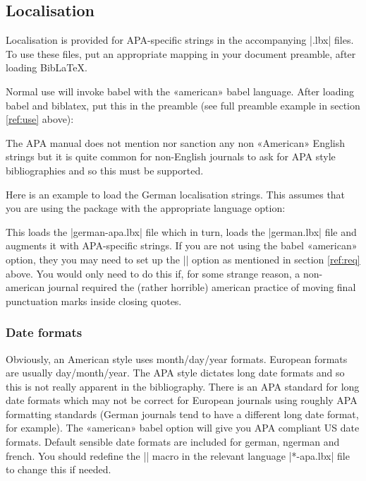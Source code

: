 \documentclass{ltxdockit}
\begin{document}
\subsection{Localisation}

Localisation is provided for APA-specific strings in the accompanying
|.lbx| files. To use these files, put an appropriate mapping in your
document preamble, after loading Bib\LaTeX.

Normal use will invoke babel with the «american» babel language. After
loading babel and biblatex, put this in the preamble (see full preamble
example in section \ref{ref:use} above):

\begin{ltxcode}
\end{ltxcode}

The APA manual does not mention nor sanction any non «American» English
strings but it is quite common for non-English journals to ask for APA style
bibliographies and so this must be supported.

Here is an example to load the German localisation strings. This assumes
that you are using the  package with the appropriate language
option:

\begin{ltxcode}
\end{ltxcode}

This loads the |german-apa.lbx| file which in turn, loads the |german.lbx|
file and augments it with APA-specific strings. If you are not using the
babel «american» option, they you may need to set up the
|\DeclareQuotePunctuation| option as mentioned in section \ref{ref:req} above.
You would only need to do this if, for some strange reason, a non-american
journal required the (rather horrible) american practice of moving final
punctuation marks inside closing quotes.

\subsubsection{Date formats}

Obviously, an American style uses month/day/year formats. European formats
are usually day/month/year. The APA style dictates long date formats and so
this is not really apparent in the bibliography. There is an APA standard
for long date formats which may not be correct for European journals using
roughly APA formatting standards (German journals tend to have a different
long date format, for example). The «american» babel option will give you
APA compliant US date formats. Default sensible date formats are included
for german, ngerman and french. You should redefine the |\mkbibdatelong|
macro in the relevant language |*-apa.lbx| file to change this if needed.
\end{document}
